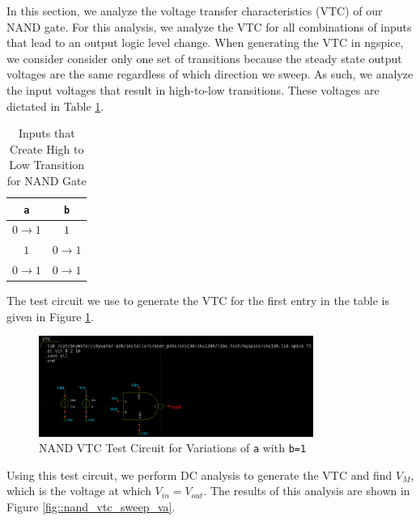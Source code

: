 \documentclass[fleqn]{article}
\begin{document}
	In this section, we analyze the voltage transfer characteristics (VTC) of our NAND gate. For this analysis, we analyze the VTC for all combinations of inputs that lead to an output logic level change. When generating the VTC in ngspice, we consider consider only one set of transitions because the steady state output voltages are the same regardless of which direction we sweep. As such, we analyze the input voltages that result in high-to-low transitions. These voltages are dictated in Table \ref{table::nand_gate_high_to_low_transitions}.
	
	\begin{table}[H]
	\begin{center}
	\caption{Inputs that Create High to Low Transition for NAND Gate}
	\label{table::nand_gate_high_to_low_transitions}
	\begin{tabular}{| c | c |}
		\hline
		\texttt{a} & \texttt{b} \\
		\hline	
		$0 \rightarrow 1$ & $1$\\
		\hline	
		$1$ & $0 \rightarrow 1$\\
		\hline	
		$0 \rightarrow 1$ & $0 \rightarrow 1$\\
		\hline
	\end{tabular}
	\end{center}
	\end{table}
	
	\noindent The test circuit we use to generate the VTC for the first entry in the table is given in Figure \ref{fig::nand_vtc_test_sweep_va}.
	
	\begin{figure}[H]
		\centerline{\includegraphics[width=0.8\textwidth]{nand_vtc_test_sweep_va.png}}
		\caption{NAND VTC Test Circuit for Variations of \texttt{a} with \texttt{b=1}}
		\label{fig::nand_vtc_test_sweep_va}
	\end{figure}	
	
	\noindent Using this test circuit, we perform DC analysis to generate the VTC and find $V_M$, which is the voltage at which $V_{in} = V_{out}$. The results of this analysis are shown in Figure \ref{fig::nand_vtc_sweep_va}.
	
\end{document}
